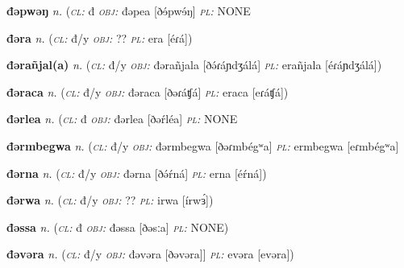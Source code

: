 \newentry
\headword\textbf{đəpwəŋ}  
\ipa{[ðɘ́pwɘ́ŋ]}
\synpos\textit{n.} 
\class(\textit{\textsc{cl:}} {đ}
\object\textit{\textsc{obj:}} đəpea [ðɘ́pwɘ́ŋ]
\plural\textit{\textsc{pl:}} NONE



\newentry
\headword\textbf{đəra}  
\ipa{[ðə́ɾá]}
\synpos\textit{n.} 
\class(\textit{\textsc{cl:}} {đ/y}
\object\textit{\textsc{obj:}} ??
\plural\textit{\textsc{pl:}} era [éɾá])

\newentry
\headword\textbf{đərañjal(a)}  
\ipa{[ðə́ɾáɲdʒál(á)]}
\synpos\textit{n.} 
\class(\textit{\textsc{cl:}} {đ/y}
\object\textit{\textsc{obj:}} đərañjala [ðə́ɾáɲdʒálá]
\plural\textit{\textsc{pl:}} erañjala [éɾáɲdʒálá])

\newentry
\headword\textbf{đəraca}  
\ipa{[ðəɾáʧá]}
\synpos\textit{n.} 
\class(\textit{\textsc{cl:}} {đ/y}
\object\textit{\textsc{obj:}} đəraca [ðəɾáʧá]
\plural\textit{\textsc{pl:}} eraca [eɾáʧá])


\newentry
\headword\textbf{đərlea}  
\ipa{[ðəŕléa]}
\synpos\textit{n.} 
\class(\textit{\textsc{cl:}} {đ}
\object\textit{\textsc{obj:}} đərlea [ðəŕléa]
\plural\textit{\textsc{pl:}} NONE

\newentry
\headword\textbf{đərmbegwa}  
\synpos\textit{n.} 
\class(\textit{\textsc{cl:}} {đ/y}
\object\textit{\textsc{obj:}} đərmbegwa [ðəɾmbégʷa]
\plural\textit{\textsc{pl:}} ermbegwa [eɾmbégʷa]

\newentry
\headword\textbf{đərna}  
\ipa{[ðə́ŕná]}
\synpos\textit{n.} 
\class(\textit{\textsc{cl:}} {đ/y}
\object\textit{\textsc{obj:}} đərna [ðə́ŕná]
\plural\textit{\textsc{pl:}} erna [éŕná])

\newentry
\headword\textbf{đərwa}  
\ipa{[ðə́rwɜ́]}
\synpos\textit{n.} 
\class(\textit{\textsc{cl:}} {đ/y}
\object\textit{\textsc{obj:}} ??
\plural\textit{\textsc{pl:}} irwa [írwɜ́])


\newentry
\headword\textbf{đəssa}  
\ipa{[ðəsːa]}
\synpos\textit{n.} 
\class(\textit{\textsc{cl:}} {đ}
\object\textit{\textsc{obj:}} đəssa [ðəsːa] 
\plural\textit{\textsc{pl:}} NONE)

\newentry
\headword\textbf{đəvəra}  
\ipa{[ðəvəra]}
\synpos\textit{n.} 
\class(\textit{\textsc{cl:}} {đ/y}
\object\textit{\textsc{obj:}} đəvəra [ðəvəra]]
\plural\textit{\textsc{pl:}} evəra [evəra])

